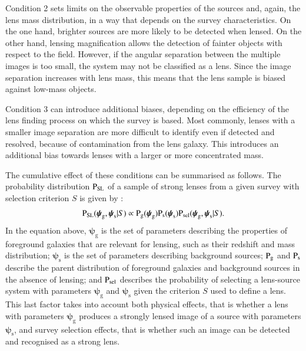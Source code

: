 \documentclass{aa}
\def\psilens{\boldsymbol{\psi}_\mathrm{g}}
\def\psisource{\boldsymbol{\psi}_\mathrm{s}}
\def\prlens{{\rm P}_\mathrm{g}}
\def\prsource{{\rm P}_\mathrm{s}}
\def\prsl{{\rm P}_\mathrm{{SL}}}
\def\psel{{\rm P}_\mathrm{sel}}
\begin{document}
Condition 2 sets limits on the observable properties of the sources and, again, the lens mass distribution, in a way that depends on the survey characteristics.
On the one hand, brighter sources are more likely to be detected when lensed. On the other hand, lensing magnification allows the detection of fainter objects with respect to the field.
However, if the angular separation between the multiple images is too small, the system may not be classified as a lens.
Since the image separation increases with lens mass, this means that the lens sample is biased against low-mass objects.

Condition 3 can introduce additional biases, depending on the efficiency of the lens finding process on which the survey is based. Most commonly, lenses with a smaller image separation are more difficult to identify even if detected and resolved, because of contamination from the lens galaxy. This introduces an additional bias towards lenses with a larger or more concentrated mass.


The cumulative effect of these conditions can be summarised as follows.
The probability distribution $\prsl$ of a sample of strong lenses from a given survey with selection criterion $S$ is given by \citep{Son22}:
\begin{equation}\label{eq:one}
\prsl(\psilens,\psisource|S) \propto \prlens(\psilens)\prsource(\psisource)\psel(\psilens,\psisource|S).
\end{equation}
In the equation above, $\psilens$ is the set of parameters describing the properties of foreground galaxies that are relevant for lensing, such as their redshift and mass distribution; $\psisource$ is the set of parameters describing background sources; $\prlens$ and $\prsource$ describe the parent distribution of foreground galaxies and background sources in the absence of lensing; and $\psel$ describes the probability of selecting a lens-source system with parameters $\psilens$ and $\psisource$ given the criterion $S$ used to define a lens.
This last factor takes into account both physical effects, that is whether a lens with parameters $\psilens$ produces a strongly lensed image of a source with parameters $\psisource$, and survey selection effects, that is whether such an image can be detected and recognised as a strong lens.
\end{document}
